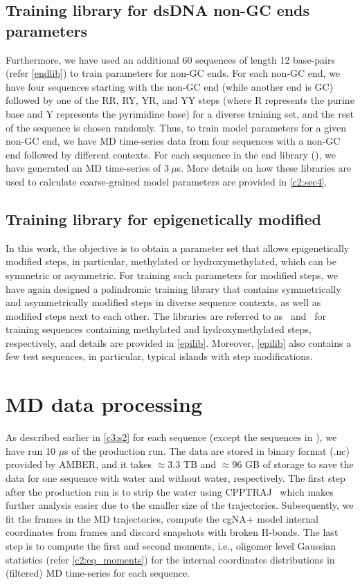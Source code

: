 \subsection{Training library for dsDNA non-GC ends parameters}
Furthermore, we have used an additional 60 sequences of length 12 base-pairs (refer \cref{endlib}) to train parameters for non-GC ends. 
For each non-GC end, we have four sequences starting with the non-GC end (while another end is GC) followed by one of the RR, RY, YR, and YY steps (where R represents the purine base and Y represents the pyrimidine base) for a diverse training set, and the rest of the sequence is chosen randomly.
Thus, to train model parameters for a given non-GC end, we have MD time-series data from four sequences with a non-GC end followed by different contexts.
For each sequence in the end library (\Lbe), we have generated an MD time-series of $3~\mu$s.
More details on how these libraries are used to calculate coarse-grained model parameters are provided in \cref{c2:sec4}.

\subsection{Training library for epigenetically modified}
In this work, the objective is to obtain a parameter set that allows epigenetically modified \cpg steps, in particular, methylated or hydroxymethylated, which can be symmetric or asymmetric.
For training such parameters for modified \cpg steps, we have again designed a palindromic training library that contains symmetrically and asymmetrically modified \cpg steps in diverse sequence contexts, as well as modified steps next to each other. 
The libraries are referred to as \Lbm \ and \Lbh \ for training sequences containing methylated and hydroxymethylated \cpg steps, respectively, and details are provided in \cref{epilib}.
Moreover, \cref{epilib} also contains a few test sequences, in particular, typical \cpg islands with \cpg step modifications.

\section{MD data processing}\label{c3:s4}
As described earlier in \cref{c3:s2} for each sequence (except the sequences in \Lbe), we have run 10 $\mu$s of the production run. 
The data are stored in binary format (.nc) provided by AMBER, and it takes $\approx 3.3$ TB and $\approx 96$ GB of storage to save the data for one sequence with water and without water, respectively.
The first step after the production run is to strip the water using CPPTRAJ~\cite{roe2013ptraj,roe2018parallelization}
which makes further analysis easier due to the smaller size of the trajectories.
Subsequently, we fit the frames in the MD trajectories, compute the cgNA$+$ model internal coordinates from frames and discard snapshots with broken H-bonds.
The last step is to compute the first and second moments, i.e., oligomer level Gaussian statistics (refer \cref{c2:eq_moments}) for the internal coordinates distributions in (filtered) MD time-series for each sequence.

